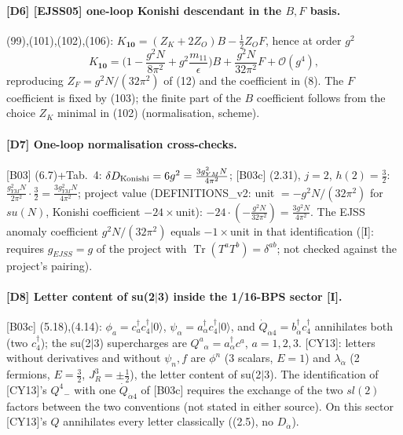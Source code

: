 \documentclass[10pt]{article}
\begin{document}
\paragraph{[D6] [EJSS05] one-loop Konishi descendant in the $B,F$ basis.} (99),(101),(102),(106): $K_{\mathbf{10}}=(Z_K+2Z_O)B-\frac12Z_OF$, hence at order $g^2$
\begin{equation*}
K_{\mathbf{10}}=\Big(1-\frac{g^2N}{8\pi^2}+g^2\frac{m_{11}}{\epsilon}\Big)B+\frac{g^2N}{32\pi^2}F+\mathcal O(g^4),
\end{equation*}
reproducing $Z_F=g^2N/(32\pi^2)$ of (12) and the coefficient in (8). The $F$ coefficient is fixed by (103); the finite part of the $B$ coefficient follows from the choice $Z_K$ minimal in (102) (normalisation, scheme).

\paragraph{[D7] One-loop normalisation cross-checks.} [B03] (6.7)+Tab.\ 4: $\delta D_{\rm Konishi}=6g^2=\frac{3g_{YM}^2N}{4\pi^2}$; [B03c] (2.31), $j=2$, $h(2)=\frac32$: $\frac{g_{YM}^2N}{2\pi^2}\cdot\frac32=\frac{3g_{YM}^2N}{4\pi^2}$; project value (DEFINITIONS\_v2: unit $=-g^2N/(32\pi^2)$ for $su(N)$, Konishi coefficient $-24\times$unit): $-24\cdot(-\frac{g^2N}{32\pi^2})=\frac{3g^2N}{4\pi^2}$. The EJSS anomaly coefficient $g^2N/(32\pi^2)$ equals $-1\times$unit in that identification ([I]: requires $g_{EJSS}=g$ of the project with $\operatorname{Tr}(T^aT^b)=\delta^{ab}$; not checked against the project's pairing).

\paragraph{[D8] Letter content of su(2$|$3) inside the 1/16-BPS sector [I].} [B03c] (5.18),(4.14): $\phi_a=c_a^\dagger c_4^\dagger|0\rangle$, $\psi_\alpha=a_\alpha^\dagger c_4^\dagger|0\rangle$, and $\dot Q_{\dot\alpha4}=b^\dagger_{\dot\alpha}c^\dagger_4$ annihilates both (two $c_4^\dagger$); the su(2$|$3) supercharges are $Q^a{}_\alpha=a^\dagger_\alpha c^a$, $a=1,2,3$. [CY13]: letters without derivatives and without $\psi_n,f$ are $\phi^n$ (3 scalars, $E=1$) and $\lambda_{\dot\alpha}$ (2 fermions, $E=\frac32$, $J_R^3=\pm\frac12$), the letter content of su(2$|$3). The identification of [CY13]'s $Q^4{}_-$ with one $\dot Q_{\dot\alpha4}$ of [B03c] requires the exchange of the two $sl(2)$ factors between the two conventions (not stated in either source). On this sector [CY13]'s $Q$ annihilates every letter classically ((2.5), no $D_{\dot\alpha}$).
\end{document}
